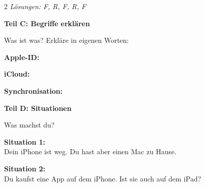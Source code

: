 \documentclass[a4paper,landscape,8pt]{extarticle}
\begin{document}
\begin{multicols}{2}
{\footnotesize\textit{Lösungen: F, R, F, R, F}}

\columnbreak

\textbf{\large Teil C: Begriffe erklären}

Was ist was? Erkläre in eigenen Worten:

\vspace{3mm}

\textbf{Apple-ID:} \dotfill

\vspace{2mm}

\dotfill

\vspace{4mm}

\textbf{iCloud:} \dotfill

\vspace{2mm}

\dotfill

\vspace{4mm}

\textbf{Synchronisation:} \dotfill

\vspace{2mm}

\dotfill

\vspace{6mm}

\textbf{\large Teil D: Situationen}

Was machst du?

\vspace{3mm}

\textbf{Situation 1:}\\
Dein iPhone ist weg. Du hast aber einen Mac zu Hause.

\vspace{2mm}

\dotfill

\vspace{2mm}

\dotfill

\vspace{4mm}

\textbf{Situation 2:}\\
Du kaufst eine App auf dem iPhone. Ist sie auch auf dem iPad?

\vspace{2mm}

\dotfill

\end{multicols}

\newpage

\end{document}
